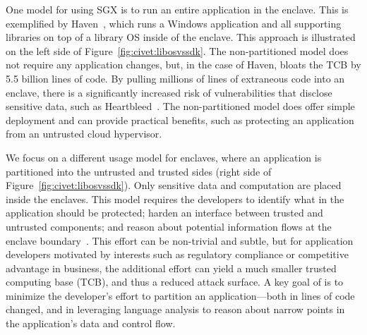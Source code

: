 One model for using SGX is to run an entire application in the enclave.
This is exemplified by Haven~\citep{baumann14haven}, which runs a Windows application and all supporting libraries
on top of a library OS inside of the enclave.  This approach is illustrated on the left side of Figure~\ref{fig:civet:libosvssdk}.
The non-partitioned model does not require any application changes, but, in the case of Haven, bloats the TCB by 5.5 billion lines of code.
By pulling millions of lines of extraneous code into an enclave, there is a significantly increased risk 
of vulnerabilities that disclose
sensitive data, such as Heartbleed~\citep{heartbleed}.
The non-partitioned model does offer simple deployment and can provide practical benefits, 
such as protecting an application from an untrusted cloud hypervisor.

We focus on a different usage model for enclaves, where an application is partitioned into
the untrusted and trusted sides (right side of Figure~\ref{fig:civet:libosvssdk}).
Only sensitive data and computation are placed inside the enclaves.
This model requires the developers to
identify what in the application should be protected; harden an interface between trusted and untrusted components; 
and reason about potential information flows at the enclave boundary~\citep{kilpatrick2003privman}.
This effort can be non-trivial and subtle, but for application developers motivated by interests such as 
regulatory compliance or competitive advantage in business, the additional effort can yield a much smaller trusted computing
base (TCB), and thus a reduced attack surface.
A key goal of \sysname{} is to minimize the developer's effort to partition an application---both in lines of 
code changed, and in leveraging language analysis to reason about narrow points in the application's data and control flow.

